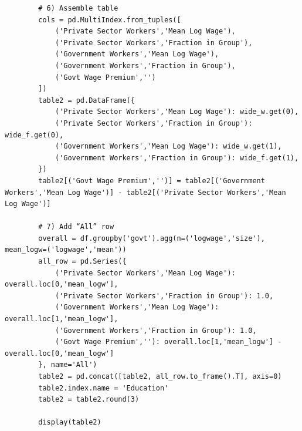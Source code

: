 \documentclass[12pt]{article}
\numberwithin{equation}{section}
\begin{document}
\begin{enumerate}[leftmargin=2em]
\begin{listing}[H]
\begin{verbatim}
        # 6) Assemble table
        cols = pd.MultiIndex.from_tuples([
            ('Private Sector Workers','Mean Log Wage'),
            ('Private Sector Workers','Fraction in Group'),
            ('Government Workers','Mean Log Wage'),
            ('Government Workers','Fraction in Group'),
            ('Govt Wage Premium','')
        ])
        table2 = pd.DataFrame({
            ('Private Sector Workers','Mean Log Wage'): wide_w.get(0),
            ('Private Sector Workers','Fraction in Group'): wide_f.get(0),
            ('Government Workers','Mean Log Wage'): wide_w.get(1),
            ('Government Workers','Fraction in Group'): wide_f.get(1),
        })
        table2[('Govt Wage Premium','')] = table2[('Government Workers','Mean Log Wage')] - table2[('Private Sector Workers','Mean Log Wage')]
        
        # 7) Add “All” row
        overall = df.groupby('govt').agg(n=('logwage','size'), mean_logw=('logwage','mean'))
        all_row = pd.Series({
            ('Private Sector Workers','Mean Log Wage'): overall.loc[0,'mean_logw'],
            ('Private Sector Workers','Fraction in Group'): 1.0,
            ('Government Workers','Mean Log Wage'): overall.loc[1,'mean_logw'],
            ('Government Workers','Fraction in Group'): 1.0,
            ('Govt Wage Premium',''): overall.loc[1,'mean_logw'] - overall.loc[0,'mean_logw']
        }, name='All')
        table2 = pd.concat([table2, all_row.to_frame().T], axis=0)
        table2.index.name = 'Education'
        table2 = table2.round(3)
        
        display(table2)
        \end{verbatim}
        \caption{Code (Part 2): Fractions, wide pivot, and final wage gap table.}
    \end{listing}
        
 
        \begin{table}[H]
          \centering
          \caption{Education-specific composition and wage gaps by sector.
          Entries rounded to three decimals. “Govt Wage Premium” is government minus private.}
          \label{tab:edu-wage-gaps}
        
          \vspace{0.3em} %
          \small
          \setlength{\tabcolsep}{5pt} %
        

\end{table}
\end{enumerate}
\end{document}
